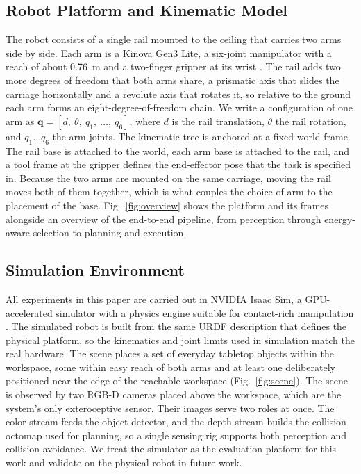 \documentclass[conference]{IEEEtran}
\begin{document}
\subsection{Robot Platform and Kinematic Model}

The robot consists of a single rail mounted to the ceiling that carries two arms
side by side. Each arm is a Kinova Gen3 Lite, a six-joint manipulator with a reach
of about 0.76~m and a two-finger gripper at its wrist \cite{Kinova}. The rail adds
two more degrees of freedom that both arms share, a prismatic axis that slides the
carriage horizontally and a revolute axis that rotates it, so relative to the ground
each arm forms an eight-degree-of-freedom chain. We write a configuration of one arm
as $\mathbf{q} = [d,\ \theta,\ q_1,\ \ldots,\ q_6]$, where $d$ is the rail
translation, $\theta$ the rail rotation, and $q_1 \ldots q_6$ the arm joints. The
kinematic tree is anchored at a fixed world frame. The rail base is attached to the
world, each arm base is attached to the rail, and a tool frame at the gripper
defines the end-effector pose that the task is specified in. Because the two arms
are mounted on the same carriage, moving the rail moves both of them together,
which is what couples the choice of arm to the placement of the base. Fig.~\ref{fig:overview}
shows the platform and its frames alongside an overview of the end-to-end pipeline,
from perception through energy-aware selection to planning and execution.

\subsection{Simulation Environment}

All experiments in this paper are carried out in NVIDIA Isaac Sim, a
GPU-accelerated simulator with a physics engine suitable for contact-rich
manipulation \cite{IsaacSim2026,Mittal2023}. The simulated robot is built from the
same URDF description that defines the physical platform, so the kinematics and
joint limits used in simulation match the real hardware. The scene places a set of
everyday tabletop objects within the workspace, some within easy reach of both arms
and at least one deliberately positioned near the edge of the reachable workspace
(Fig.~\ref{fig:scene}). The scene is observed by two RGB-D cameras placed above the
workspace, which are the system's only exteroceptive sensor. Their images serve two
roles at once. The color stream feeds the object detector, and the depth stream
builds the collision octomap used for planning, so a single sensing rig supports
both perception and collision avoidance. We treat the simulator as the evaluation
platform for this work and validate on the physical robot in future work.
\end{document}
